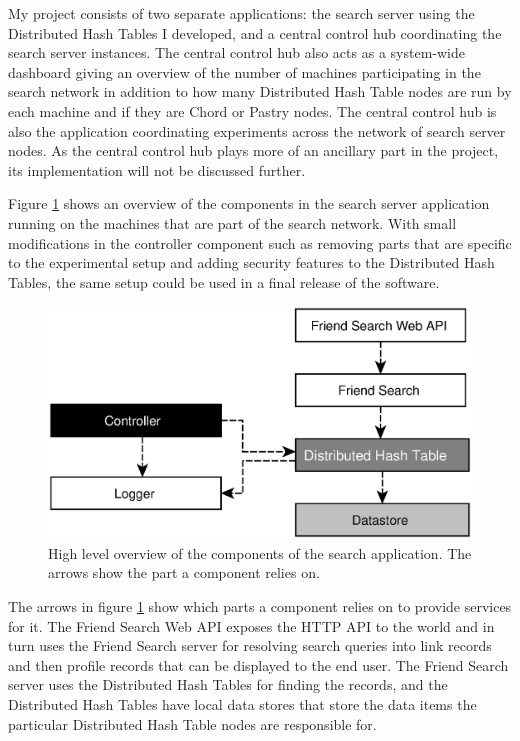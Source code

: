 \mbox{}

My project consists of two separate applications: the search server using the Distributed Hash Tables I developed, and a central control hub coordinating the search server instances.
The central control hub also acts as a system-wide dashboard giving an overview of the number of machines participating in the search network in addition to how many Distributed Hash Table nodes are run by each machine and if they are Chord or Pastry nodes. The central control hub is also the application coordinating experiments across the network of search server nodes.
As the central control hub plays more of an ancillary part in the project, its implementation will not be discussed further.

Figure \ref{figComponents} shows an overview of the components in the search server application running on the machines that are part of the search network. With small modifications in the controller component such as removing parts that are specific to the experimental setup and adding security features to the Distributed Hash Tables, the same setup could be used in a final release of the software.

\begin{figure}[!htb]
\begin{center}
	\includegraphics[width=0.9\linewidth]{illustrations/ComponentOverview.eps}
\caption{High level overview of the components of the search application. The arrows show the part a component relies on.}
\label{figComponents}
\end{center}
\end{figure}

The arrows in figure \ref{figComponents} show which parts a component relies on to provide services for it. The Friend Search Web API exposes the HTTP API to the world and in turn uses the Friend Search server for resolving search queries into link records and then profile records that can be displayed to the end user. The Friend Search server uses the Distributed Hash Tables for finding the records, and the Distributed Hash Tables have local data stores that store the data items the particular Distributed Hash Table nodes are responsible for.


